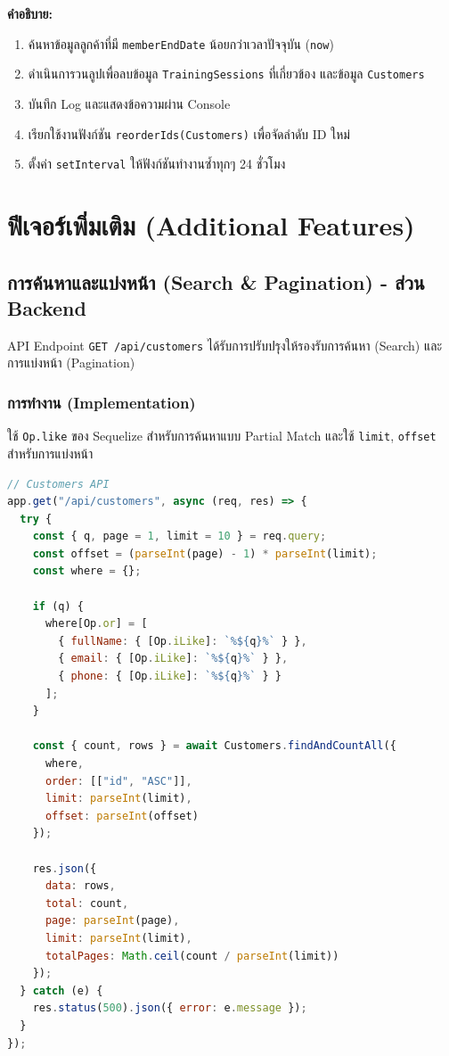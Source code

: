 \textbf{คำอธิบาย:}
\begin{enumerate}
    \item ค้นหาข้อมูลลูกค้าที่มี \texttt{memberEndDate} น้อยกว่าเวลาปัจจุบัน (\texttt{now})
    \item ดำเนินการวนลูปเพื่อลบข้อมูล \texttt{TrainingSessions} ที่เกี่ยวข้อง และข้อมูล \texttt{Customers}
    \item บันทึก Log และแสดงข้อความผ่าน Console
    \item เรียกใช้งานฟังก์ชัน \texttt{reorderIds(Customers)} เพื่อจัดลำดับ ID ใหม่
    \item ตั้งค่า \texttt{setInterval} ให้ฟังก์ชันทำงานซ้ำทุกๆ 24 ชั่วโมง
\end{enumerate}



\section{ฟีเจอร์เพิ่มเติม (Additional Features)}

\subsection{การค้นหาและแบ่งหน้า (Search \& Pagination) - ส่วน Backend}
API Endpoint \texttt{GET /api/customers} ได้รับการปรับปรุงให้รองรับการค้นหา (Search) และการแบ่งหน้า (Pagination)

\subsubsection{การทำงาน (Implementation)}
ใช้ \texttt{Op.like} ของ Sequelize สำหรับการค้นหาแบบ Partial Match และใช้ \texttt{limit}, \texttt{offset} สำหรับการแบ่งหน้า

\begin{lstlisting}[language=JavaScript, caption={Logic การค้นหาและแบ่งหน้าใน server.js}, label={code:backend-search-pagination}]
// Customers API
app.get("/api/customers", async (req, res) => {
  try {
    const { q, page = 1, limit = 10 } = req.query;
    const offset = (parseInt(page) - 1) * parseInt(limit);
    const where = {};
    
    if (q) {
      where[Op.or] = [
        { fullName: { [Op.iLike]: `%${q}%` } },
        { email: { [Op.iLike]: `%${q}%` } },
        { phone: { [Op.iLike]: `%${q}%` } }
      ];
    }

    const { count, rows } = await Customers.findAndCountAll({
      where,
      order: [["id", "ASC"]],
      limit: parseInt(limit),
      offset: parseInt(offset)
    });

    res.json({
      data: rows,
      total: count,
      page: parseInt(page),
      limit: parseInt(limit),
      totalPages: Math.ceil(count / parseInt(limit))
    });
  } catch (e) {
    res.status(500).json({ error: e.message });
  }
});
\end{lstlisting}

